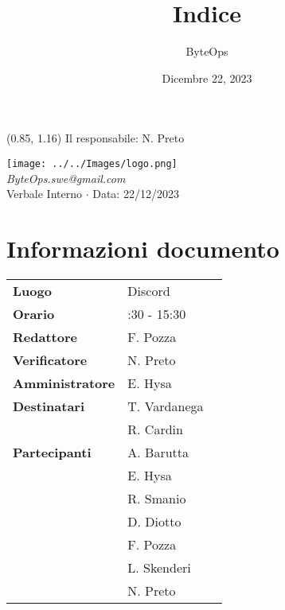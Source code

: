 \documentclass{article}
\title{\textbf{\fontsize{28}{6}\selectfont Indice}}
\author{\fontsize{14}{6}\selectfont ByteOps}
\date{Dicembre 22, 2023}
\begin{document}
\begin{textblock*}{\textwidth}(0.85\textwidth, 1.16\textheight)
    Il responsabile: N. Preto
\end{textblock*}

\pagestyle{fancy}
\begin{center}
\texttt{[image: ../../Images/logo.png]} \\
\vspace{0.2cm}
\textcolor[RGB]{60, 60, 60}{\textit{ByteOps.swe@gmail.com}} \\
\vspace{1cm}
\fontsize{16}{6}\selectfont Verbale Interno $\cdot$ Data: 22/12/2023 \\
\vspace{0.5cm}
\end{center}

\section*{Informazioni documento}
\def\arraystretch{1.2}
\begin{tabular}{>{\raggedleft\arraybackslash}p{}|>{\raggedright\arraybackslash}p{}c}
\hline
\addlinespace
\textbf{Luogo} & Discord \vspace{10pt} \\
\textbf{Orario} & 14:30 - 15:30 \vspace{10pt} \\
\textbf{Redattore} & F. Pozza \vspace{10pt} \\
\textbf{Verificatore} & N. Preto \vspace{10pt} \\
\textbf{Amministratore} & E. Hysa \vspace{10pt} \\
\textbf{Destinatari} & T. Vardanega \\ & R. Cardin \vspace{10pt} \\
\textbf{Partecipanti} & A. Barutta \\ & E. Hysa \\ & R. Smanio \\ & D. Diotto \\ & F. Pozza \\ & L. Skenderi \\ & N. Preto \vspace{10pt} \\
\end{tabular}
\pagebreak 
\end{document}
